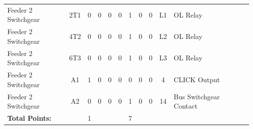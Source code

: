 \begin{table}[!htp]
{\begin{tabular}{lcccccccccll}
			Feeder 2 Switchgear          & 2T1                     & 0                                           & 0                                          & 0           & 0           & 1            & 0                & 0 & L1                           & OL Relay                         &                \\
			Feeder 2 Switchgear          & 4T2                     & 0                                           & 0                                          & 0           & 0           & 1            & 0                & 0 & L2                           & OL Relay                         &                \\
			Feeder 2 Switchgear          & 6T3                     & 0                                           & 0                                          & 0           & 0           & 1            & 0                & 0 & L3                           & OL Relay                         &                \\
			Feeder 2 Switchgear          & A1                      & 1                                           & 0                                          & 0           & 0           & 0            & 0                & 0 & 4                            & CLICK Output                     &                \\
			Feeder 2 Switchgear          & A2                      & 0                                           & 0                                          & 0           & 0           & 1            & 0                & 0 & 14                           & Bus Switchgear Contact           &                \\ \midrule
			\textbf{Total Points:}       &                         & 1                                           &                                            &             &             & 7            &                  &   &                              &                                  &                \\ \bottomrule
		\end{tabular}
	}
\end{table}
